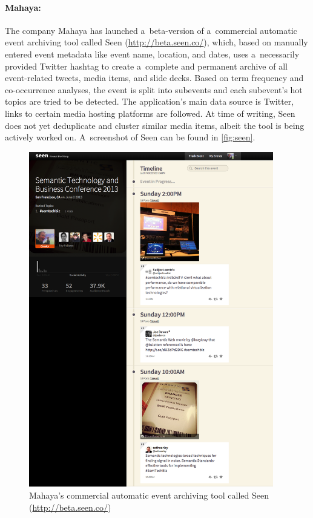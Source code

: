 \paragraph{Mahaya:}

The company Mahaya has launched a~beta-version
of a~commercial automatic event archiving tool called Seen
(\url{http://beta.seen.co/}),
which, based on manually entered event metadata like event name,
location, and dates, uses a~necessarily provided Twitter hashtag
to create a~complete and permanent archive of all event-related tweets,
media items, and slide decks.
Based on term frequency and co-occurrence analyses,
the event is split into subevents
and each subevent's hot topics are tried to be detected.
The application's main data source is Twitter,
links to certain media hosting platforms are followed.
At time of writing, Seen does not yet deduplicate and cluster
similar media items,
albeit the tool is being actively worked on.
A~screenshot of Seen can be found in \autoref{fig:seen}.

\begin{figure}
  \centering
  \includegraphics[width=0.95\textwidth,height=0.9\textheight,keepaspectratio]{seen.png}
  \caption[Mahaya's commercial automatic event archiving tool Seen]{Mahaya's commercial automatic event archiving tool called Seen
    (\url{http://beta.seen.co/})}
  \label{fig:seen}
\end{figure}

